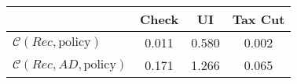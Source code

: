 \begin{tabular}{@{}lccc@{}} 
\toprule 
                          & Check      & UI    & Tax Cut    \\  \midrule 
$\mathcal{C}(Rec,\text{policy})$ & 0.011  & 0.580  & 0.002     \\ 
$\mathcal{C}(Rec, AD,\text{policy})$ & 0.171  & 1.266  & 0.065     \\ 
\end{tabular}  
